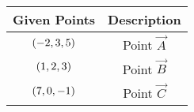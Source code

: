 \begin{tabular}[12pt]{ |c| c|}
    \hline
    \textbf{Given Points} & \textbf{Description} \\ 
    \hline
    $\left(-2,3,5\right)$ & Point $\vec{A}$ \\
    \hline 
    $\left(1,2,3\right)$ & Point $\vec{B}$\\
    \hline
    $\left(7,0,-1\right)$ & Point $\vec{C}$\\
    \hline 
\end{tabular}
